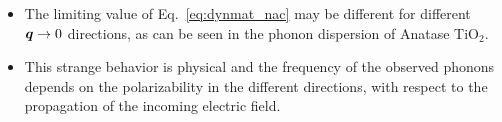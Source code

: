 \begin{frame}
  \begin{itemize}
  \justifying\small
  \item The limiting value of Eq.~\ref{eq:dynmat_nac} may be different for
    different $\boldsymbol{q}\to0$ directions, as can be seen in the phonon dispersion
    of Anatase TiO$_2$.
    
  \item This strange behavior is physical and the frequency of the observed
    phonons depends on the polarizability in the different directions, with
    respect to the propagation of the incoming electric field.
  \end{itemize}
\end{frame}

